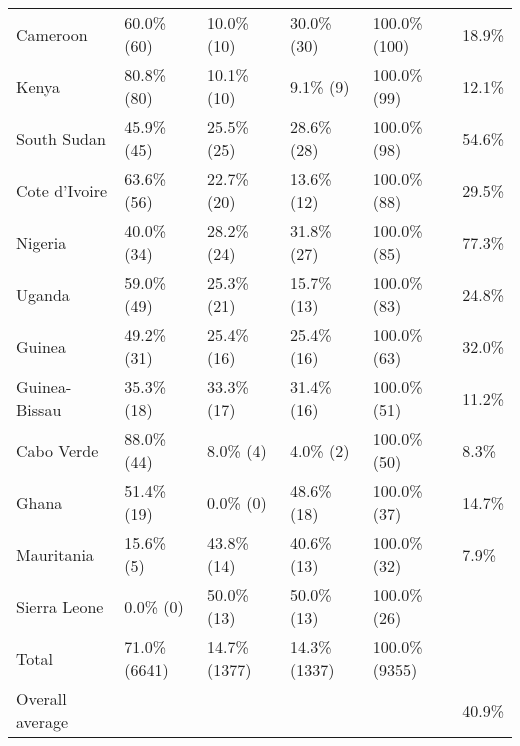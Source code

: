 \begin{table}[ht]
\begin{tabular}{llllll}
  Cameroon & 60.0\%   (60) & 10.0\%   (10) & 30.0\%   (30) & 100.0\%  (100) & 18.9\% \\ 
  Kenya & 80.8\%   (80) & 10.1\%   (10) & 9.1\%    (9) & 100.0\%   (99) & 12.1\% \\ 
  South Sudan & 45.9\%   (45) & 25.5\%   (25) & 28.6\%   (28) & 100.0\%   (98) & 54.6\% \\ 
  Cote d'Ivoire & 63.6\%   (56) & 22.7\%   (20) & 13.6\%   (12) & 100.0\%   (88) & 29.5\% \\ 
  Nigeria & 40.0\%   (34) & 28.2\%   (24) & 31.8\%   (27) & 100.0\%   (85) & 77.3\% \\ 
  Uganda & 59.0\%   (49) & 25.3\%   (21) & 15.7\%   (13) & 100.0\%   (83) & 24.8\% \\ 
  Guinea & 49.2\%   (31) & 25.4\%   (16) & 25.4\%   (16) & 100.0\%   (63) & 32.0\% \\ 
  Guinea-Bissau & 35.3\%   (18) & 33.3\%   (17) & 31.4\%   (16) & 100.0\%   (51) & 11.2\% \\ 
  Cabo Verde & 88.0\%   (44) & 8.0\%    (4) & 4.0\%    (2) & 100.0\%   (50) & 8.3\% \\ 
  Ghana & 51.4\%   (19) & 0.0\%    (0) & 48.6\%   (18) & 100.0\%   (37) & 14.7\% \\ 
  Mauritania & 15.6\%    (5) & 43.8\%   (14) & 40.6\%   (13) & 100.0\%   (32) & 7.9\% \\ 
  Sierra Leone & 0.0\%    (0) & 50.0\%   (13) & 50.0\%   (13) & 100.0\%   (26) &  \\ 
  Total & 71.0\% (6641) & 14.7\% (1377) & 14.3\% (1337) & 100.0\% (9355) &  \\ 
  Overall average &  &  &  &  & 40.9\% \\ 
   \hline
\end{tabular}
\end{table}
